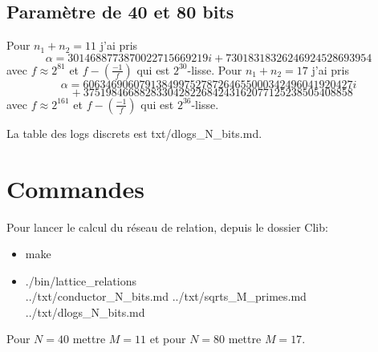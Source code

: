 \documentclass[12pt]{article}
\theoremstyle{plain}
\theoremstyle{definition}
\begin{document}
\subsection{Paramètre de 40 et 80 bits}
Pour $n_1+n_2=11$ j'ai pris 
\[\alpha=3014688773870022715669219i + 73018318326246924528693954\]
avec $f\approx 2^{81}$ et $f- (\frac{-1}{f})$ 
qui est $2^{30}$-lisse.
Pour $n_1+n_2=17$ j'ai pris 
\[\alpha=606346906079138499752787264655000342496041920427i\]
\[~~+ 375198466882833042822684243162077125238505408858\]
avec $f\approx 2^{161}$ et $f-(\frac{-1}{f})$
qui est $2^{36}$-lisse. 

La table des logs discrets est txt/dlogs\_N\_bits.md.

\section{Commandes}
Pour lancer le calcul du réseau de relation, depuis 
le dossier Clib:
\begin{itemize}
    \item make
    \item ./bin/lattice\_relations\\ ../txt/conductor\_N\_bits.md ../txt/sqrts\_M\_primes.md ../txt/dlogs\_N\_bits.md
\end{itemize}

Pour $N=40$ mettre $M=11$ et pour $N=80$ mettre $M=17$.
\end{document}
